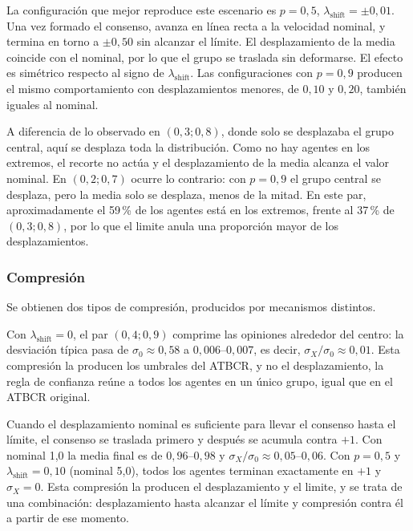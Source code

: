 \documentclass[11pt,a4paper]{article}
\begin{document}
La configuración que mejor reproduce este escenario es $p=0{,}5$, $\lambda_{\mathrm{shift}}=\pm0{,}01$. Una vez formado el consenso, avanza en línea recta a la velocidad nominal, y termina en torno a $\pm0{,}50$ sin alcanzar el límite. El desplazamiento de la media coincide con el nominal, por lo que el grupo se traslada sin deformarse. El efecto es simétrico respecto al signo de $\lambda_{\mathrm{shift}}$. Las configuraciones con $p=0{,}9$ producen el mismo comportamiento con desplazamientos menores, de $0{,}10$ y $0{,}20$, también iguales al nominal.

A diferencia de lo observado en $(0{,}3;0{,}8)$, donde solo se desplazaba el grupo central, aquí se desplaza toda la distribución. Como no hay agentes en los extremos, el recorte no actúa y el desplazamiento de la media alcanza el valor nominal. En $(0{,}2;0{,}7)$ ocurre lo contrario: con $p=0{,}9$ el grupo central se desplaza, pero la media solo se desplaza, menos de la mitad. En este par, aproximadamente el 59\,\% de los agentes está en los extremos, frente al 37\,\% de $(0{,}3;0{,}8)$, por lo que el limite anula una proporción mayor de los desplazamientos.

\subsubsection{Compresión}
\label{sec:shift-esc-compresion}

Se obtienen dos tipos de compresión, producidos por mecanismos distintos.

Con $\lambda_{\mathrm{shift}}=0$, el par $(0{,}4;0{,}9)$ comprime las opiniones alrededor del centro: la desviación típica pasa de $\sigma_0\approx0{,}58$ a $0{,}006$--$0{,}007$, es decir, $\sigma_X/\sigma_0\approx0{,}01$. Esta compresión la producen los umbrales del ATBCR, y no el desplazamiento, la regla de confianza reúne a todos los agentes en un único grupo, igual que en el ATBCR original.

Cuando el desplazamiento nominal es suficiente para llevar el consenso hasta el límite, el consenso se traslada primero y después se acumula contra $+1$. Con nominal 1,0 la media final es de $0{,}96$--$0{,}98$ y $\sigma_X/\sigma_0\approx0{,}05$--$0{,}06$. Con $p=0{,}5$ y $\lambda_{\mathrm{shift}}=0{,}10$ (nominal 5,0), todos los agentes terminan exactamente en $+1$ y $\sigma_X=0$. Esta compresión la producen el desplazamiento y el limite, y se trata de una combinación: desplazamiento hasta alcanzar el límite y compresión contra él a partir de ese momento.
\end{document}

